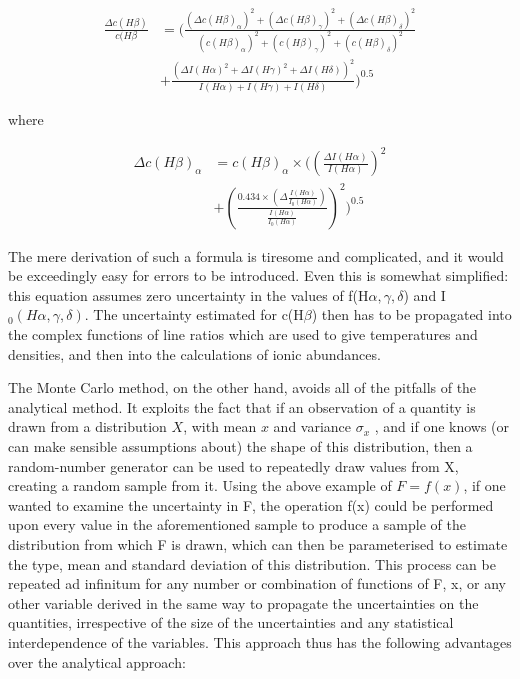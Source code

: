 \documentclass[useAMS,usenatbib]{mn2e}
\begin{document}
\begin{eqnarray}\nonumber
\frac{\Delta c(H\beta)}{c(H\beta} &= \bigg(\frac{(\Delta c(H\beta)_\alpha)^2 + (\Delta c(H\beta)_\gamma)^2+(\Delta c(H\beta)_\delta)^2}{(c(H\beta)_\alpha)^2 + (c(H\beta)_\gamma)^2 + (c(H\beta)_\delta)^2}\\
&+ \frac{(\Delta I(H\alpha)^2 + \Delta I(H\gamma)^2 + \Delta I(H\delta))^2}{I(H\alpha) + I(H\gamma) + I(H\delta)}\bigg)^{0.5}
\end{eqnarray}

where

\begin{eqnarray}
\Delta c(H\beta)_\alpha &= c(H\beta)_\alpha \times \bigg(\left(\frac{\Delta I(H\alpha)}{I(H\alpha)}\right)^2 \\
&+ \left(\frac{0.434 \times (\Delta\frac{I(H\alpha)}{I_0(H\alpha)})}{\frac{I(H\alpha)}{I_0(H\alpha)}}\right)^2\bigg)^{0.5}
\end{eqnarray}

The mere derivation of such a formula is tiresome and complicated, and it would be exceedingly easy for errors to be introduced.  Even this is somewhat simplified: this equation assumes zero uncertainty in the values of f(H$\alpha, \gamma, \delta$) and I$_0(H\alpha, \gamma, \delta)$.  The uncertainty estimated for c(H$\beta$) then has to be propagated into the complex functions of line ratios which are used to give temperatures and densities, and then into the calculations of ionic abundances.

The Monte Carlo method, on the other hand, avoids all of the pitfalls of the analytical method.  It exploits the fact that if an observation of a quantity is drawn from a distribution $X$, with mean $x$ and variance $\sigma_x$ , and if one knows (or can make sensible assumptions about) the shape of this distribution, then a random-number generator can be used to repeatedly draw values from X, creating a random sample from it. Using the above example of $F = f (x)$, if one wanted to examine the uncertainty in F, the operation f(x) could be performed upon every value in the aforementioned sample to produce a sample of the distribution from which F is drawn, which can then be parameterised to estimate the type, mean and standard deviation of this distribution. This process can be repeated ad infinitum for any number or combination of functions of F, x, or any other variable derived in the same way to propagate the uncertainties on the quantities, irrespective of the size of the uncertainties and any statistical interdependence of the variables.  This approach thus has the following advantages over the analytical approach:
\end{document}
